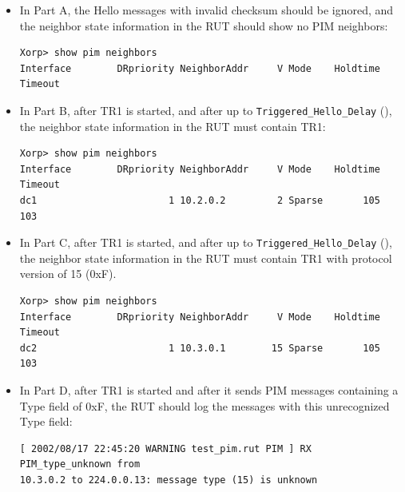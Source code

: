 \documentclass[11pt]{report}
\begin{document}
\begin{itemize}

  \item In Part A, the Hello messages with invalid checksum should be ignored,
        and the neighbor state information in the RUT should show no PIM
        neighbors:

\begin{verbatim}
Xorp> show pim neighbors 
Interface        DRpriority NeighborAddr     V Mode    Holdtime Timeout
\end{verbatim}


  \item In Part B, after TR1 is started, and after up to
        \verb=Triggered_Hello_Delay=
        ({\PimsmTriggeredHelloDelay}), the neighbor state information in the
        RUT must contain TR1:

\begin{verbatim}
Xorp> show pim neighbors 
Interface        DRpriority NeighborAddr     V Mode    Holdtime Timeout
dc1                       1 10.2.0.2         2 Sparse       105     103
\end{verbatim}

  \item In Part C, after TR1 is started, and after up to
        \verb=Triggered_Hello_Delay=
        ({\PimsmTriggeredHelloDelay}), the neighbor state information in the
        RUT must contain TR1 with protocol version of 15 (0xF).

\begin{verbatim}
Xorp> show pim neighbors 
Interface        DRpriority NeighborAddr     V Mode    Holdtime Timeout
dc2                       1 10.3.0.1        15 Sparse       105     103
\end{verbatim}

  \item In Part D, after TR1 is started and after it sends PIM messages
        containing a Type field of 0xF, the RUT should log the messages with
        this unrecognized Type field:

\begin{verbatim}
[ 2002/08/17 22:45:20 WARNING test_pim.rut PIM ] RX PIM_type_unknown from
10.3.0.2 to 224.0.0.13: message type (15) is unknown
\end{verbatim}

\end{itemize}
\end{document}
